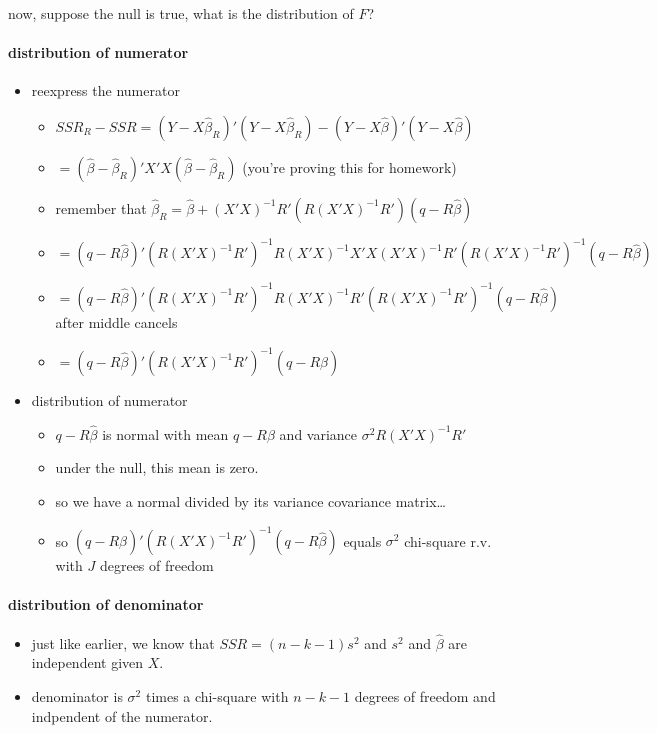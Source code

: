 \documentclass[11pt]{article}
\begin{document}
      now, suppose the null is true, what is the distribution of $F$?
\paragraph{distribution of numerator}
\label{sec-2-2-2-1}

\begin{itemize}
\item reexpress the numerator
\begin{itemize}
\item $SSR_R - SSR = (Y - X\hat\beta_R)'(Y - X\hat\beta_R) - (Y -
             X\hat\beta)'(Y - X\hat\beta)$
\item $= (\hat\beta - \hat\beta_R)'X'X(\hat\beta - \hat\beta_R)$
             (you're proving this for homework)
\item remember that $\hat\beta_R = \hat\beta + (X'X)^{-1}
             R'(R(X'X)^{-1}R')(q - R\hat\beta)$
\item $= (q -
             R\hat\beta)'(R(X'X)^{-1}R')^{-1}R(X'X)^{-1}X'X(X'X)^{-1}R'(R(X'X)^{-1}R')^{-1}
             (q - R\hat\beta)$
\item $= (q -
             R\hat\beta)'(R(X'X)^{-1}R')^{-1}R(X'X)^{-1} R'(R(X'X)^{-1}R')^{-1}
             (q - R\hat\beta)$ after middle cancels
\item $= (q -
             R\hat\beta)'(R(X'X)^{-1}R')^{-1}(q - R\hat\beta)$
\end{itemize}
\item distribution of numerator
\begin{itemize}
\item $q - R\hat\beta$ is normal with mean $q - R\beta$ and
             variance $\sigma^2 R(X'X)^{-1}R'$
\item under the null, this mean is zero.
\item so we have a normal divided by its variance covariance matrix\ldots{}
\item so $(q - R\hat\beta)'(R(X'X)^{-1}R')^{-1}(q - R\hat\beta)$
             equals $\sigma^2$ chi-square r.v. with $J$ degrees of freedom
\end{itemize}
\end{itemize}
\paragraph{distribution of denominator}
\label{sec-2-2-2-2}

\begin{itemize}
\item just like earlier, we know that $SSR = (n-k-1) s^2$ and $s^2$
         and $\hat \beta$ are independent given $X$.
\item denominator is $\sigma^2$ times a chi-square with $n-k-1$
         degrees of freedom and indpendent of the numerator.
\end{itemize}
\end{document}
